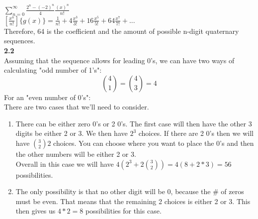 \documentclass[10pt,a4paper]{report}
\begin{document}
	$\sum_{n=0}^{\infty}\frac{2^n-(-2)^n}{4}\frac{(x)^n}{n!}$\\
	$[\frac{x^n}{n!}]\{g(x)\} = \frac{1}{n!} + 4\frac{x^3}{3!} + 16\frac{x^5}{5!} + 64\frac{x^7}{7!} + ...$\\
	Therefore, 64 is the coefficient and the amount of possible n-digit quaternary sequences.\\
	\newline
	\textbf{2.2}\\
	Assuming that the sequence allows for leading 0's, we can have two ways of calculating "odd number of 1's":
	\[\binom{4}{1} = \binom{4}{3} = 4\]
	For an "even number of 0's":\\
	There are two cases that we'll need to consider.
	\begin{enumerate}
		\item There can be either zero 0's or 2 0's.  The first case will then have the other 3 digits be either 2 or 3.  We then have $2^3$ choices.  If there are 2 0's then we will have $\binom{3}{2}2$ choices.  You can choose where you want to place the 0's and then the other numbers will be either 2 or 3.\\
		Overall in this case we will have $4(2^3 + 2\binom{3}{2}) = 4(8 + 2 * 3) = 56$ possibilities.
		\item The only possibility is that no other digit will be 0, because the \# of zeros must be even.  That means that the remaining 2 choices is either 2 or 3.  This then gives us $4 * 2 = 8$ possibilities for this case.\\
	\end{enumerate}
	
\end{document}

